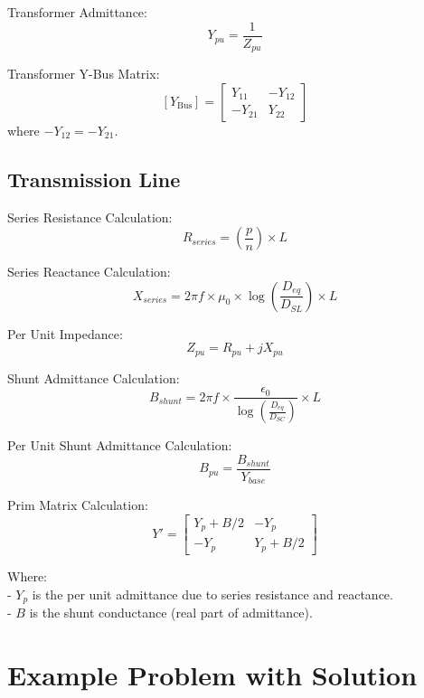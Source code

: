 \documentclass{article}
\begin{document}
	\noindent
	Transformer Admittance:
	\[ Y_{pu} = \frac{1}{Z_{pu}} \]
	
	\noindent
	Transformer Y-Bus Matrix:
	\[ [Y_{\text{Bus}}] = 
	\begin{bmatrix}
		Y_{11} & -Y_{12} \\
		-Y_{21} & Y_{22}
	\end{bmatrix} \]
	where \( -Y_{12} = -Y_{21} \).
	
	\subsection*{Transmission Line}
	Series Resistance Calculation: 
	\[
	R_{series} = (\frac{p}{n}) \times L
	\]
	
	\noindent	
	Series Reactance Calculation: 
	\[
	X_{series} = 2 \pi f \times \mu_0 \times \log(\frac{D_{eq}}{D_{SL}}) \times L
	\]
	
	\noindent
	Per Unit Impedance: 
	\[
	Z_{pu} = R_{pu} + j X_{pu}
	\]
	
	\noindent
	Shunt Admittance Calculation: 
	\[
	B_{shunt} = 2 \pi f \times \frac{\epsilon_0}{\log(\frac{D_{eq}}{D_{SC}})} \times L
	\]

	\noindent
	Per Unit Shunt Admittance Calculation: 
	\[
	B_{pu} = \frac{B_{shunt}}{Y_{base}}
	\]

	\noindent	
	Prim Matrix Calculation:
	\[
	Y' = \begin{bmatrix}
		Y_p + B/2 & -Y_p \\
		-Y_p & Y_p + B/2
	\end{bmatrix}
	\]
	
	\noindent
	Where: \\
	- \(Y_p\) is the per unit admittance due to series resistance and reactance. \\
	- \(B\) is the shunt conductance (real part of admittance).
	
	\section{Example Problem with Solution}
	
\end{document}
